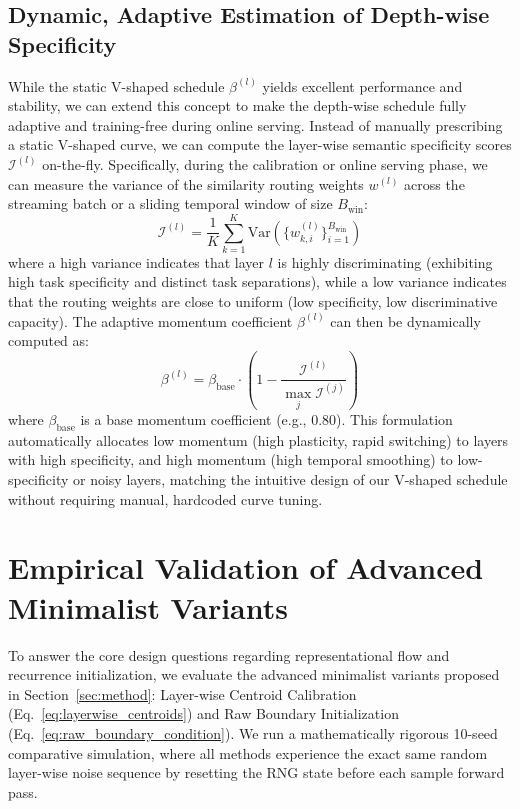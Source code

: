 \documentclass{article}
\theoremstyle{plain}
\theoremstyle{definition}
\theoremstyle{remark}
\begin{document}
    \subsection{Dynamic, Adaptive Estimation of Depth-wise Specificity}
    While the static V-shaped schedule $\beta^{(l)}$ yields excellent performance and stability, we can extend this concept to make the depth-wise schedule fully adaptive and training-free during online serving. Instead of manually prescribing a static V-shaped curve, we can compute the layer-wise semantic specificity scores $\mathcal{I}^{(l)}$ on-the-fly. 
    Specifically, during the calibration or online serving phase, we can measure the variance of the similarity routing weights $w^{(l)}$ across the streaming batch or a sliding temporal window of size $B_{\text{win}}$:
    \begin{equation}
        \mathcal{I}^{(l)} = \frac{1}{K} \sum_{k=1}^K \text{Var}\left(\{w_{k, i}^{(l)}\}_{i=1}^{B_{\text{win}}}\right)
    \end{equation}
    where a high variance indicates that layer $l$ is highly discriminating (exhibiting high task specificity and distinct task separations), while a low variance indicates that the routing weights are close to uniform (low specificity, low discriminative capacity).
    The adaptive momentum coefficient $\beta^{(l)}$ can then be dynamically computed as:
    \begin{equation}
        \beta^{(l)} = \beta_{\text{base}} \cdot \left(1 - \frac{\mathcal{I}^{(l)}}{\max_{j} \mathcal{I}^{(j)}}\right)
    \end{equation}
    where $\beta_{\text{base}}$ is a base momentum coefficient (e.g., $0.80$). This formulation automatically allocates low momentum (high plasticity, rapid switching) to layers with high specificity, and high momentum (high temporal smoothing) to low-specificity or noisy layers, matching the intuitive design of our V-shaped schedule without requiring manual, hardcoded curve tuning.

    \section{Empirical Validation of Advanced Minimalist Variants}
    \label{app:ablation_variants}

    To answer the core design questions regarding representational flow and recurrence initialization, we evaluate the advanced minimalist variants proposed in Section~\ref{sec:method}: Layer-wise Centroid Calibration (Eq.~\ref{eq:layerwise_centroids}) and Raw Boundary Initialization (Eq.~\ref{eq:raw_boundary_condition}). We run a mathematically rigorous 10-seed comparative simulation, where all methods experience the exact same random layer-wise noise sequence by resetting the RNG state before each sample forward pass. 
\end{document}
